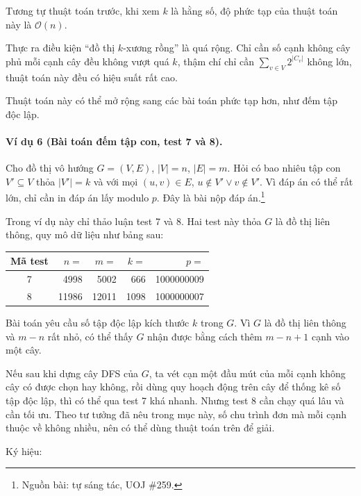 \documentclass[11pt]{article}
\newcommand{\Oh}{\mathcal{O}}
\begin{document}
Tương tự thuật toán trước, khi xem \(k\) là hằng số, độ phức tạp của thuật toán
này là \(\Oh(n)\).

Thực ra điều kiện ``đồ thị \(k\)-xương rồng'' là quá rộng. Chỉ cần số cạnh
không cây phủ mỗi cạnh cây đều không vượt quá \(k\), thậm chí chỉ cần
\(\sum_{v\in V}2^{|C_v|}\) không lớn, thuật toán này đều có hiệu suất rất cao.

Thuật toán này có thể mở rộng sang các bài toán phức tạp hơn, như đếm tập độc
lập.

\paragraph{Ví dụ 6 (Bài toán đếm tập con, test 7 và 8).}
Cho đồ thị vô hướng \(G=(V,E)\), \(|V|=n\), \(|E|=m\). Hỏi có bao nhiêu tập con
\(V'\subseteq V\) thỏa \(|V'|=k\) và với mọi \((u,v)\in E\),
\(u\notin V'\vee v\notin V'\). Vì đáp án có thể rất lớn, chỉ cần in đáp án lấy
modulo \(p\). Đây là bài nộp đáp án.\footnote{Nguồn bài: tự sáng tác, UOJ
\#259.}

Trong ví dụ này chỉ thảo luận test 7 và 8. Hai test này thỏa \(G\) là đồ thị
liên thông, quy mô dữ liệu như bảng sau:

\begin{center}
\small
\begin{tabular}{c r r r r}
\textbf{Mã test} & \(n=\) & \(m=\) & \(k=\) & \(p=\)\\
\hline
7 & 4998 & 5002 & 666 & 1000000009\\
8 & 11986 & 12011 & 1098 & 1000000007
\end{tabular}
\end{center}

Bài toán yêu cầu số tập độc lập kích thước \(k\) trong \(G\). Vì \(G\) là đồ
thị liên thông và \(m-n\) rất nhỏ, có thể thấy \(G\) nhận được bằng cách thêm
\(m-n+1\) cạnh vào một cây.

Nếu sau khi dựng cây DFS của \(G\), ta vét cạn một đầu mút của mỗi cạnh không
cây có được chọn hay không, rồi dùng quy hoạch động trên cây để thống kê số
tập độc lập, thì có thể qua test 7 khá nhanh. Nhưng test 8 cần chạy quá lâu và
cần tối ưu. Theo tư tưởng đã nêu trong mục này, số chu trình đơn mà mỗi cạnh
thuộc về không nhiều, nên có thể dùng thuật toán trên để giải.

Ký hiệu:
\end{document}
